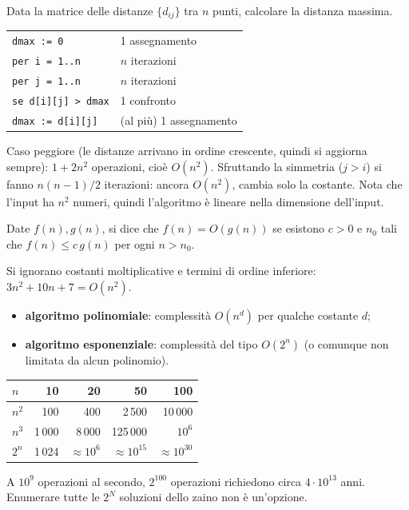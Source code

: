 \begin{esbox}
Data la matrice delle distanze $\{d_{ij}\}$ tra $n$ punti, calcolare la distanza massima.
\begin{center}
\begin{tabular}{@{}ll@{}}
\texttt{dmax := 0} & 1 assegnamento\\
\texttt{per i = 1..n} & $n$ iterazioni\\
\quad\texttt{per j = 1..n} & $n$ iterazioni\\
\qquad\texttt{se d[i][j] > dmax} & 1 confronto\\
\qquad\quad\texttt{dmax := d[i][j]} & (al più) 1 assegnamento
\end{tabular}
\end{center}
Caso peggiore (le distanze arrivano in ordine crescente, quindi si aggiorna sempre): $1+2n^2$ operazioni, cioè $O(n^2)$. Sfruttando la simmetria ($j>i$) si fanno $n(n-1)/2$ iterazioni: ancora $O(n^2)$, cambia solo la costante. Nota che l'input ha $n^2$ numeri, quindi l'algoritmo è lineare nella dimensione dell'input.
\end{esbox}

\begin{defbox}[notazione $O$]
Date $f(n),g(n)$, si dice che $f(n)=O(g(n))$ se esistono $c>0$ e $n_0$ tali che $f(n)\le c\,g(n)$ per ogni $n>n_0$.
\end{defbox}
Si ignorano costanti moltiplicative e termini di ordine inferiore: $3n^2+10n+7=O(n^2)$.
\begin{itemize}[nosep]
\item \textbf{algoritmo polinomiale}: complessità $O(n^d)$ per qualche costante $d$;
\item \textbf{algoritmo esponenziale}: complessità del tipo $O(2^n)$ (o comunque non limitata da alcun polinomio).
\end{itemize}

\begin{center}
\begin{tabular}{@{}lrrrr@{}}
\toprule
$n$ & 10 & 20 & 50 & 100\\ \midrule
$n^2$ & 100 & 400 & 2\,500 & 10\,000\\
$n^3$ & 1\,000 & 8\,000 & 125\,000 & $10^6$\\
$2^n$ & 1\,024 & $\approx10^6$ & $\approx 10^{15}$ & $\approx10^{30}$\\
\bottomrule
\end{tabular}
\end{center}
A $10^9$ operazioni al secondo, $2^{100}$ operazioni richiedono circa $4\cdot10^{13}$ anni. Enumerare tutte le $2^N$ soluzioni dello zaino non è un'opzione.

